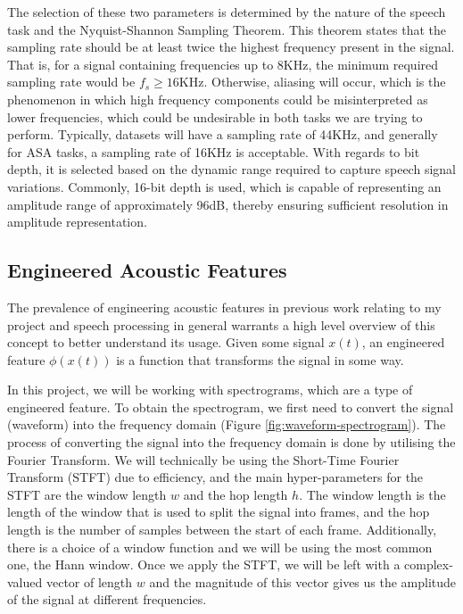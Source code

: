 \documentclass[logo,bsc,singlespacing,parskip,online]{infthesis}
\begin{document}
The selection of these two parameters is determined by the nature of the speech task and the Nyquist-Shannon Sampling Theorem.
This theorem states that the sampling rate should be at least twice the highest frequency present in the signal. 
That is, for a signal containing frequencies up to 8KHz, the minimum required sampling rate would be $f_s \ge 16$KHz.
Otherwise, aliasing will occur, which is the phenomenon in which high frequency components could be misinterpreted as lower frequencies,
which could be undesirable in both tasks we are trying to perform. Typically, datasets will have a sampling rate 
of 44KHz, and generally for ASA tasks, a sampling rate of 16KHz is acceptable. 
With regards to bit depth, it is selected based on the dynamic range required to capture speech signal variations. 
Commonly, 16-bit depth is used, which is capable of representing an amplitude range of approximately 96dB, thereby ensuring sufficient resolution in amplitude representation.

\subsection{Engineered Acoustic Features}
The prevalence of engineering acoustic features in previous work relating to my project and speech processing in general
warrants a high level overview of this concept to better understand its usage. 
Given some signal $x(t)$, an engineered feature $\phi(x(t))$ is a function that transforms the signal in some way.

In this project, we will be working with spectrograms, which are a type of engineered feature.
To obtain the spectrogram, we first need to convert the signal (waveform) into the frequency domain (Figure \ref{fig:waveform-spectrogram}).
The process of converting the signal into the frequency domain is done by utilising 
the Fourier Transform. We will technically be using the Short-Time Fourier Transform (STFT) 
due to efficiency, and the main hyper-parameters for the STFT are the window length $w$ 
and the hop length $h$. The window length is the length of the window that is used to 
split the signal into frames, and the hop length is the number of samples between the 
start of each frame. Additionally, there is a choice of a window function and we will 
be using the most common one, the Hann window. Once we apply the STFT, we will be 
left with a complex-valued vector of length $w$ and the magnitude of this vector 
gives us the amplitude of the signal at different frequencies. 
\end{document}
